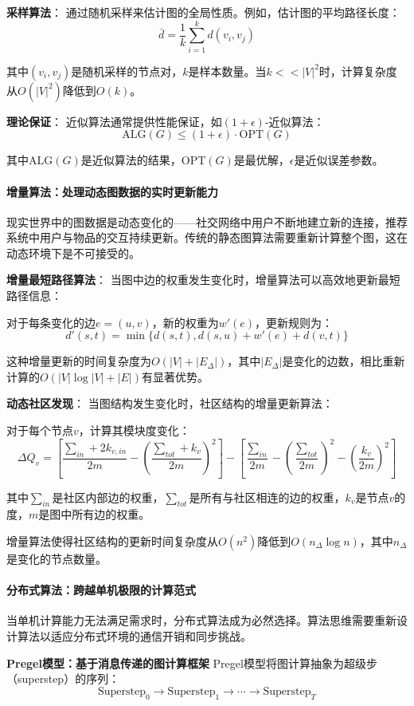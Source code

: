 \textbf{采样算法}：
通过随机采样来估计图的全局性质。例如，估计图的平均路径长度：
$$\bar{d} = \frac{1}{k}\sum_{i=1}^{k} d(v_i, v_j)$$

其中$(v_i, v_j)$是随机采样的节点对，$k$是样本数量。当$k << |V|^2$时，计算复杂度从$O(|V|^2)$降低到$O(k)$。

\textbf{理论保证}：
近似算法通常提供性能保证，如$(1+\epsilon)$-近似算法：
$$\text{ALG}(G) \leq (1+\epsilon) \cdot \text{OPT}(G)$$

其中$\text{ALG}(G)$是近似算法的结果，$\text{OPT}(G)$是最优解，$\epsilon$是近似误差参数。

\paragraph{增量算法：处理动态图数据的实时更新能力}
现实世界中的图数据是动态变化的——社交网络中用户不断地建立新的连接，推荐系统中用户与物品的交互持续更新。传统的静态图算法需要重新计算整个图，这在动态环境下是不可接受的。

\textbf{增量最短路径算法}：
当图中边的权重发生变化时，增量算法可以高效地更新最短路径信息：

对于每条变化的边$e=(u,v)$，新的权重为$w'(e)$，更新规则为：
$$d'(s,t) = \min\{d(s,t), d(s,u) + w'(e) + d(v,t)\}$$

这种增量更新的时间复杂度为$O(|V| + |E_{\Delta}|)$，其中$|E_{\Delta}|$是变化的边数，相比重新计算的$O(|V|\log|V| + |E|)$有显著优势。

\textbf{动态社区发现}：
当图结构发生变化时，社区结构的增量更新算法：

对于每个节点$v$，计算其模块度变化：
$$\Delta Q_v = \left[\frac{\sum_{in} + 2k_{v,in}}{2m} - \left(\frac{\sum_{tot} + k_v}{2m}\right)^2\right] - \left[\frac{\sum_{in}}{2m} - \left(\frac{\sum_{tot}}{2m}\right)^2 - \left(\frac{k_v}{2m}\right)^2\right]$$

其中$\sum_{in}$是社区内部边的权重，$\sum_{tot}$是所有与社区相连的边的权重，$k_v$是节点$v$的度，$m$是图中所有边的权重。

增量算法使得社区结构的更新时间复杂度从$O(n^2)$降低到$O(n_{\Delta}\log n)$，其中$n_{\Delta}$是变化的节点数量。

\paragraph{分布式算法：跨越单机极限的计算范式}
当单机计算能力无法满足需求时，分布式算法成为必然选择。算法思维需要重新设计算法以适应分布式环境的通信开销和同步挑战。

\textbf{Pregel模型：基于消息传递的图计算框架}
Pregel模型将图计算抽象为超级步（superstep）的序列：
$$\text{Superstep}_0 \rightarrow \text{Superstep}_1 \rightarrow \cdots \rightarrow \text{Superstep}_T$$

